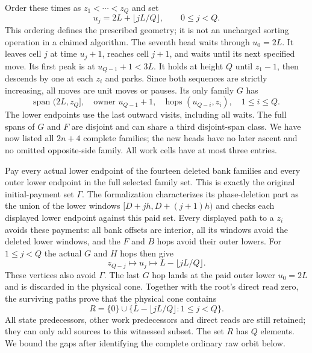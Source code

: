 \begin{outline}
Order these times as $z_1<\cdots<z_Q$ and set
\[
 u_j=2L+\lfloor jL/Q\rfloor,\qquad0\le j<Q.
\]
This ordering defines the prescribed geometry; it is not an uncharged
sorting operation in a claimed algorithm.
The seventh head waits through $u_0=2L$.  It leaves cell $j$ at time
$u_j+1$, reaches cell $j+1$, and waits until its next specified move.
Its first peak is at $u_{Q-1}+1<3L$.  It holds at height $Q$ until
$z_1-1$, then descends by one at each $z_i$ and parks.  Since both
sequences are strictly increasing, all moves are unit moves or pauses.
Its only family $G$ has
\[
 \text{span }(2L,z_Q],\quad
 \text{owner }u_{Q-1}+1,\quad
 \text{hops }(u_{Q-i},z_i),\quad1\le i\le Q.
\]
The lower endpoints use the last outward visits, including all waits.
The full spans of $G$ and $F$ are disjoint and can share a third
disjoint-span class.  We have now listed all $2n+4$ complete families;
the new heads have no later ascent and no omitted opposite-side
family.  All work cells have at most three entries.

Pay every actual lower endpoint of the fourteen deleted bank families
and every outer lower endpoint in the full selected family set.  This is
exactly the original initial-payment set $\Gamma$.  The formalization
characterizes its phase-deletion part as the union of the lower windows
$[D+jh,D+(j+1)h)$ and checks each displayed lower endpoint against
this paid set.
Every displayed path to a $z_i$ avoids these payments: all bank offsets
are interior, all its windows avoid the deleted lower windows, and
the $F$ and $B$ hops avoid their outer lowers.  For $1\le j<Q$ the
actual $G$ and $H$ hops then give
\[
 z_{Q-j}\longmapsto u_j
       \longmapsto L-\lfloor jL/Q\rfloor.
\]
These vertices also avoid $\Gamma$.  The last $G$ hop lands at the
paid outer lower $u_0=2L$ and is discarded in the physical cone.
Together with the root's direct read zero, the surviving paths prove
that the physical cone contains
\begin{equation}
 R=\{0\}\cup
   \{L-\lfloor jL/Q\rfloor:1\le j<Q\}.
 \label{eq:serial-physical-grid}
\end{equation}
All state predecessors, other work predecessors and direct reads are
still retained; they can only add sources to this witnessed subset.
The set $R$ has $Q$ elements.  We bound the gaps after identifying the
complete ordinary raw orbit below.


\end{outline}
